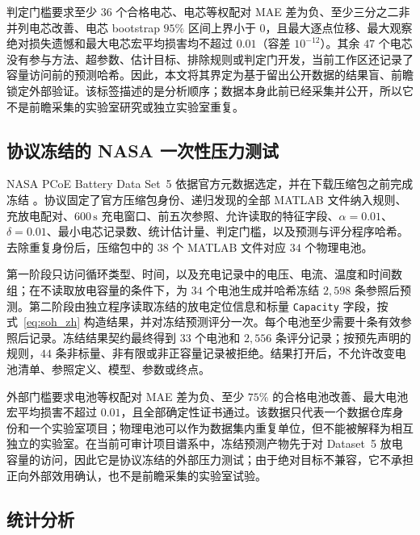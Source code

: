 \documentclass[UTF8,11pt]{ctexart}
\begin{document}
判定门槛要求至少 $36$ 个合格电芯、电芯等权配对 MAE 差为负、至少三分之二非并列电芯改善、电芯 bootstrap $95\%$ 区间上界小于 $0$，且最大逐点位移、最大观察绝对损失遗憾和最大电芯宏平均损害均不超过 $0.01$（容差 $10^{-12}$）。其余 $47$ 个电芯没有参与方法、超参数、估计目标、排除规则或判定门开发，当前工作区还记录了容量访问前的预测哈希。因此，本文将其界定为基于留出公开数据的结果盲、前瞻锁定外部验证。该标签描述的是分析顺序；数据本身此前已经采集并公开，所以它不是前瞻采集的实验室研究或独立实验室重复。

\subsection{协议冻结的 NASA 一次性压力测试}

NASA PCoE Battery Data Set~5 依据官方元数据选定，并在下载压缩包之前完成冻结 \citep{saha2007nasa}。协议固定了官方压缩包身份、递归发现的全部 MATLAB 文件纳入规则、充放电配对、$600\,\mathrm{s}$ 充电窗口、前五次参照、允许读取的特征字段、$\alpha=0.01$、$\delta=0.01$、最小电芯记录数、统计估计量、判定门槛，以及预测与评分程序哈希。去除重复身份后，压缩包中的 $38$ 个 MATLAB 文件对应 $34$ 个物理电池。

第一阶段只访问循环类型、时间，以及充电记录中的电压、电流、温度和时间数组；在不读取放电容量的条件下，为 $34$ 个电池生成并哈希冻结 $2{,}598$ 条参照后预测。第二阶段由独立程序读取冻结的放电定位信息和标量 \texttt{Capacity} 字段，按式~\eqref{eq:soh_zh} 构造结果，并对冻结预测评分一次。每个电池至少需要十条有效参照后记录。冻结结果契约最终得到 $33$ 个电池和 $2{,}556$ 条评分记录；按预先声明的规则，$44$ 条非标量、非有限或非正容量记录被拒绝。结果打开后，不允许改变电池清单、参照定义、模型、参数或终点。

外部门槛要求电池等权配对 MAE 差为负、至少 $75\%$ 的合格电池改善、最大电池宏平均损害不超过 $0.01$，且全部确定性证书通过。该数据只代表一个数据仓库身份和一个实验室项目；物理电池可以作为数据集内重复单位，但不能被解释为相互独立的实验室。在当前可审计项目谱系中，冻结预测产物先于对 Dataset~5 放电容量的访问，因此它是协议冻结的外部压力测试；由于绝对目标不兼容，它不承担正向外部效用确认，也不是前瞻采集的实验室试验。

\subsection{统计分析}
\end{document}
